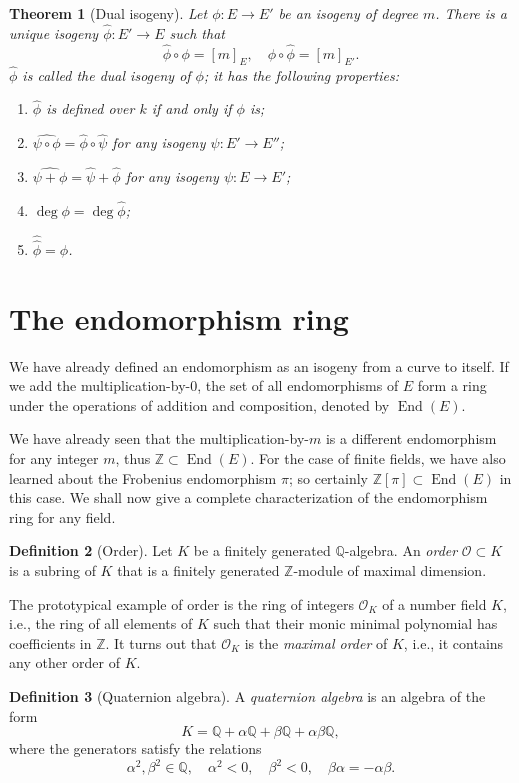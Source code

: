 \documentclass[10pt]{article}
\theoremstyle{plain}
\newtheorem{theorem}{Theorem}
\theoremstyle{definition}
\newtheorem{definition}[theorem]{Definition}
\DeclareMathOperator{\End}{End} %
\def\O{\ensuremath{\mathcal{O}}}
\begin{document}
\begin{theorem}[Dual isogeny]
  Let $ϕ:E\to E'$ be an isogeny of degree $m$. %
  There is a unique isogeny $\hat{ϕ}:E'\to E$ such that
  \[\hat{ϕ}∘ϕ = [m]_E, \quad ϕ∘\hat{ϕ} = [m]_{E'}.\] %
  $\hat{ϕ}$ is called the \emph{dual isogeny of $ϕ$}; it has the
  following properties:
  
  \begin{enumerate}
  \item $\hat{ϕ}$ is defined over $k$ if and only if $ϕ$ is;
  \item $\widehat{ψ∘ϕ} = \hat{ϕ}∘\hat{ψ}$ for any isogeny $ψ:E'\to E''$;
  \item $\widehat{ψ+ϕ} = \hat{ψ} + \hat{ϕ}$ for any isogeny $ψ:E\to E'$;
  \item $\deg ϕ = \deg\hat{ϕ}$;
  \item $\hat{\hat{ϕ}} = ϕ$.
  \end{enumerate}
\end{theorem}


\section{The endomorphism ring}

We have already defined an endomorphism as an isogeny from a curve to
itself. %
If we add the multiplication-by-$0$, the set of all endomorphisms of
$E$ form a ring under the operations of addition and composition,
denoted by $\End(E)$. %

We have already seen that the multiplication-by-$m$ is a different
endomorphism for any integer $m$, thus $ℤ⊂\End(E)$. %
For the case of finite fields, we have also learned about the
Frobenius endomorphism $π$; so certainly $ℤ[π]⊂\End(E)$ in this
case. %
We shall now give a complete characterization of the endomorphism ring
for any field.

\begin{definition}[Order]
  Let $K$ be a finitely generated $ℚ$-algebra. %
  An \emph{order} $\O⊂K$ is a subring of $K$ that is a finitely
  generated $ℤ$-module of maximal dimension.
\end{definition}

The prototypical example of order is the ring of integers $\O_K$ of a
number field $K$, i.e., the ring of all elements of $K$ such that
their monic minimal polynomial has coefficients in $ℤ$. %
It turns out that $\O_K$ is the \emph{maximal order} of $K$, i.e., it
contains any other order of $K$.

\begin{definition}[Quaternion algebra]
  A \emph{quaternion algebra} is an algebra of the form
  \[K = ℚ + αℚ + βℚ + αβℚ,\]
  where the generators satisfy the relations
  \[α^2,β^2∈ℚ, \quad α^2<0, \quad β^2 < 0, \quad βα=-αβ.\]
\end{definition}
\end{document}
